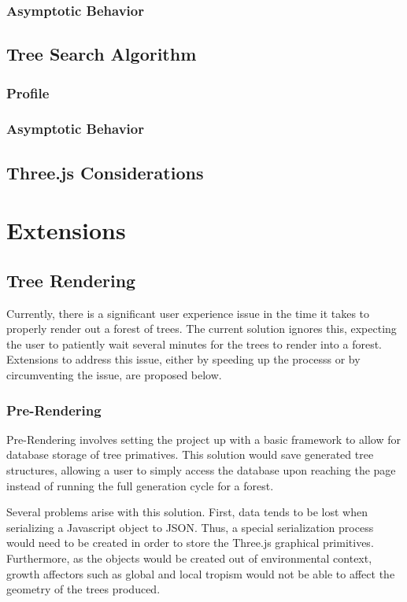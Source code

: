 \documentclass{article}
\newcommand{\tab}{\hspace*{2em}}
\begin{document}
            \subsubsection{Asymptotic Behavior}
        \subsection{Tree Search Algorithm}
            \subsubsection{Profile}
            \subsubsection{Asymptotic Behavior}
        \subsection{Three.js Considerations}

    \section{Extensions}
        \subsection{Tree Rendering}
    \tab Currently, there is a significant user experience issue in the time it takes to properly
render out a forest of trees. The current solution ignores this, expecting the user to patiently
wait several minutes for the trees to render into a forest. Extensions to address this issue,
either by speeding up the processs or by circumventing the issue, are proposed below.

            \subsubsection{Pre-Rendering}
    \tab Pre-Rendering involves setting the project up with a basic framework to allow for database
storage of tree primatives. This solution would save generated tree structures, allowing a user to
simply access the database upon reaching the page instead of running the full generation cycle for
a forest.

    \tab Several problems arise with this solution. First, data tends to be lost when serializing a
Javascript object to JSON. Thus, a special serialization process would need to be created in order
to store the Three.js graphical primitives. Furthermore, as the objects would be created out of
environmental context, growth affectors such as global and local tropism would not be able to
affect the geometry of the trees produced.
\end{document}
